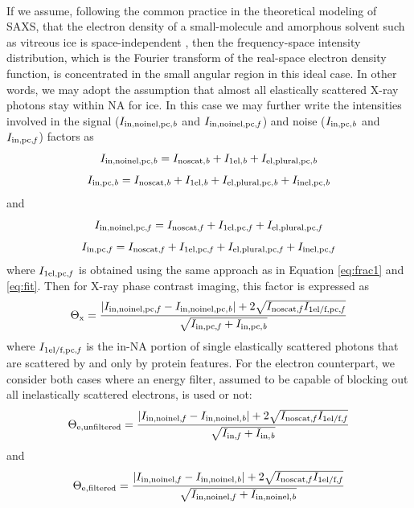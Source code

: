 \documentclass[]{article}
\newcommand\noscatb{\textup{\scriptsize{noscat,\textit b}}}
\newcommand\selb{\textup{\scriptsize{1el,\textit b}}}
\newcommand\innoinelb{\textup{\scriptsize{in,noinel,\textit b}}}
\newcommand\inelpcb{\textup{\scriptsize{inel,pc,\textit b}}}
\newcommand\elplpcb{\textup{\scriptsize{el,plural,pc,\textit b}}}
\newcommand\innoinelpcb{\textup{\scriptsize{in,noinel,pc,\textit b}}}
\newcommand\inb{\textup{\scriptsize{in,\textit b}}}
\newcommand\inpcb{\textup{\scriptsize{in,pc,\textit b}}}
\newcommand\noscatf{\textup{\scriptsize{noscat,\textit f}}}
\newcommand\selff{\textup{\scriptsize{1el/f,\textit f}}}
\newcommand\innoinelf{\textup{\scriptsize{in,noinel,\textit f}}}
\newcommand\inelpcf{\textup{\scriptsize{inel,pc,\textit f}}}
\newcommand\elplpcf{\textup{\scriptsize{el,plural,pc,\textit f}}}
\newcommand\innoinelpcf{\textup{\scriptsize{in,noinel,pc,\textit f}}}
\newcommand\selpcf{\textup{\scriptsize{1el,pc,\textit f}}}
\newcommand\selfpcf{\textup{\scriptsize{1el/f,pc,\textit f}}}
\newcommand\inff{\textup{\scriptsize{in,\textit f}}}
\newcommand\inpcf{\textup{\scriptsize{in,pc,\textit f}}}
\begin{document}
\paragraph{} If we assume, following the common practice in the theoretical modeling of SAXS, that the electron density of a small-molecule and amorphous solvent such as vitreous ice is space-independent \cite{Kikhney:2015dq}, then the frequency-space intensity distribution, which is the Fourier transform of the real-space electron density function, is concentrated in the small angular region in this ideal case. In other words, we may adopt the assumption that almost all elastically scattered X-ray photons stay within NA for ice. In this case we may further write the intensities involved in the signal ($I_{\innoinelpcb}$ and $I_{\innoinelpcf}$) and noise ($I_{\inpcb}$ and $I_{\inpcf}$) factors as
\begin{equation}
I_{\innoinelpcb} = I_{\noscatb} + I_{\selb} + I_{\elplpcb}
\end{equation}
\begin{equation}
I_{\inpcb} = I_{\noscatb} + I_{\selb} + I_{\elplpcb} + I_{\inelpcb}
\end{equation}
and
\begin{equation}
I_{\innoinelpcf} = I_{\noscatf} + I_{\selpcf} + I_{\elplpcf}
\end{equation}
\begin{equation}
I_{\inpcf} = I_{\noscatf} + I_{\selpcf} + I_{\elplpcf} + I_{\inelpcf}
\end{equation}
where $I_{\selpcf}$ is obtained using the same approach as in Equation \ref{eq:frac1} and \ref{eq:fit}. Then for X-ray phase contrast imaging, this factor is expressed as
\begin{equation}
\Theta_\mathrm{x} = \frac{|I_{\innoinelpcf}-I_{\innoinelpcb}|+2\sqrt{I_{\noscatf}I_{\selfpcf}}}{\sqrt{I_{\inpcf}+I_{\inpcb}}}
\end{equation}
where $I_{\selfpcf}$ is the in-NA portion of single elastically scattered photons that are scattered by and only by protein features. For the electron counterpart, we consider both cases where an energy filter, assumed to be capable of blocking out all inelastically scattered electrons, is used or not:
\begin{equation}
\Theta_{\mathrm{e,unfiltered}} = \frac{|I_{\innoinelf}-I_{\innoinelb}|+2\sqrt{I_{\noscatf}I_{\selff}}}{\sqrt{I_{\inff}+I_{\inb}}}
\end{equation}
and
\begin{equation}
\Theta_{\mathrm{e,filtered}} = \frac{|I_{\innoinelf}-I_{\innoinelb}|+2\sqrt{I_{\noscatf}I_{\selff}}}{\sqrt{I_{\innoinelf}+I_{\innoinelb}}}
\end{equation}
\end{document}
